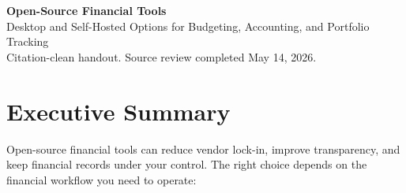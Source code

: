 \documentclass[11pt]{article}
\begin{document}
\begin{center}
  {\Huge\bfseries\color{ink} Open-Source Financial Tools}\\[0.3em]
  {\Large\color{accent} Desktop and Self-Hosted Options for Budgeting, Accounting, and Portfolio Tracking}\\[0.8em]
  {\color{muted}Citation-clean handout. Source review completed May 14, 2026.}
\end{center}


\section{Executive Summary}

Open-source financial tools can reduce vendor lock-in, improve transparency, and keep financial records under your control. The right choice depends on the financial workflow you need to operate:
\end{document}
